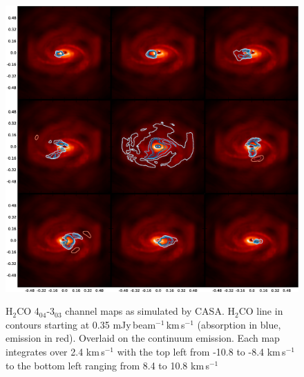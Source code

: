 \documentclass[useAMS,usenatbib]{mn2e}
\begin{document}
%
%
%
%
%

\begin{figure}
 \includegraphics[width=168mm]{Figures/sim/channel_map-1.eps} 
 \label{h2co_chanmap}
 \caption{H$_2$CO 4$_{04}$-3$_{03}$ channel maps as simulated by CASA. H$_2$CO line in contours starting at 0.35 mJy$\,$beam$^{-1}\,$km$\,$s$^{-1}$ (absorption in blue, emission in red). Overlaid on the continuum emission. Each map integrates over 2.4 km$\,$s$^{-1}$ with the top left from -10.8 to -8.4 km$\,$s$^{-1}$ to the bottom left ranging from 8.4 to 10.8 km$\,$s$^{-1}$}
\end{figure}
\end{document}
